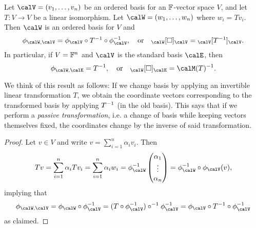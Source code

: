 \begin{proposition}
    Let $\calV = (v_1, \ldots, v_n)$ be an ordered basis for an $\mathbb{F}$-vector space $V$, and let $T \colon V \to V$ be a linear isomorphism. Let $\calW = (w_1, \ldots, w_n)$ where $w_i = Tv_i$. Then $\calW$ is an ordered basis for $V$ and
    \begin{equation*}
        \basischange{\calW}{\calV}
            = \coordmap{\calV} \circ \inv{T} \circ \inv{\coordmap{\calV}},
        \quad \text{or} \quad
        \basischangemat{\calW}{\calV}
            = \mr{\calV}{\inv{T}}{\calV}.
    \end{equation*}
    In particular, if $V = \mathbb{F}^n$ and $\calV$ is the standard basis $\calE$, then
    \begin{equation*}
        \basischange{\calW}{\calE}
            = \inv{T},
        \quad \text{or} \quad
        \basischangemat{\calW}{\calE}
            = \inv{\smr{T}}.
    \end{equation*}
\end{proposition}
%
We think of this result as follows: If we change basis by applying an invertible linear transformation $T$, we obtain the coordinate vectors corresponding to the transformed basis by applying $T^{-1}$ (in the old basis). This says that if we perform a \emph{passive transformation}, i.e. a change of basis while keeping vectors themselves fixed, the coordinates change by the inverse of said transformation.

\begin{proof}
    Let $v \in V$ and write $v = \sum_{i=1}^n \alpha_i v_i$. Then
    \begin{equation*}
        Tv
            = \sum_{i=1}^n \alpha_i Tv_i
            = \sum_{i=1}^n \alpha_i w_i
            = \inv{\coordmap{\calW}} \colvec{\alpha_1 \\ \vdots \\ \alpha_n}
            = \inv{\coordmap{\calW}} \circ \coordmap{\calV}(v),
    \end{equation*}
    implying that
    \begin{equation*}
        \basischange{\calW}{\calV}
            = \coordmap{\calW} \circ \inv{\coordmap{\calV}}
            = (T \circ \inv{\coordmap{\calV}})\inv \circ \inv{\coordmap{\calV}}
            = \coordmap{\calV} \circ \inv{T} \circ \inv{\coordmap{\calV}}
    \end{equation*}
    as claimed.
\end{proof}